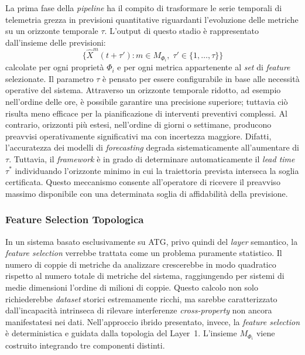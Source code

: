 La prima fase della \textit{pipeline} ha il compito di trasformare le serie temporali di telemetria
grezza in previsioni quantitative riguardanti l'evoluzione delle metriche su un orizzonte temporale
$\tau$. L'output di questo stadio è rappresentato dall'insieme delle previsioni:
\begin{equation}
\label{eq:fase1_output}
\bigl\{\hat{X}^m(t+\tau') : m \in M_{\Phi_i},\; \tau' \in \{1,\ldots,\tau\}\bigr\}
\end{equation}
calcolate per ogni proprietà $\Phi_i$ e per ogni metrica appartenente al \textit{set} di
\textit{feature} selezionate.
Il parametro $\tau$ è pensato per essere configurabile in base alle necessità operative del sistema.
Attraverso un orizzonte temporale ridotto, ad esempio nell'ordine delle ore, è possibile garantire
una precisione superiore; tuttavia ciò risulta meno efficace per la pianificazione di interventi
preventivi complessi. Al contrario, orizzonti più estesi, nell'ordine di giorni o settimane,
producono preavvisi operativamente significativi ma con incertezza maggiore. Difatti, l'accuratezza
dei modelli di \textit{forecasting} degrada sistematicamente all'aumentare di $\tau$. Tuttavia, il
\textit{framework} è in grado di determinare automaticamente il \textit{lead time} $\tau^*$
individuando l'orizzonte minimo in cui la traiettoria prevista interseca la soglia certificata.
Questo meccanismo consente all'operatore di ricevere il preavviso massimo disponibile con una
determinata soglia di affidabilità della previsione.

\subsubsection{Feature Selection Topologica}
\label{sec:feature_selection}

In un sistema basato esclusivamente su \gls{ATG}, privo quindi del \textit{layer} semantico, la
\textit{feature selection} verrebbe trattata come un problema puramente statistico. Il numero di
coppie di metriche da analizzare crescerebbe in modo quadratico rispetto al numero totale di
metriche del sistema, raggiungendo per sistemi di medie dimensioni l'ordine di milioni di coppie.
Questo calcolo non solo richiederebbe \textit{dataset} storici estremamente ricchi, ma sarebbe
caratterizzato dall'incapacità intrinseca di rilevare interferenze \textit{cross-property} non
ancora manifestatesi nei dati.
Nell'approccio ibrido presentato, invece, la \textit{feature selection} è deterministica e guidata
dalla topologia del Layer~1. L'insieme $M_{\Phi_i}$ viene costruito integrando tre componenti
distinti.


